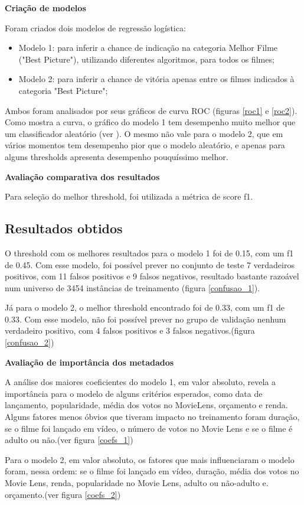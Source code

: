             \textbf{Criação de modelos}\par
            Foram criados dois modelos de regressão logística:
            
            \begin{itemize}
                \item Modelo 1: para inferir a chance de indicação na categoria Melhor Filme ("Best Picture"), utilizando diferentes algoritmos, para todos os filmes;
                \item Modelo 2: para inferir a chance de vitória apenas entre os filmes indicados à categoria "Best Picture";
            \end{itemize}
            
            Ambos foram analisados por seus gráficos de curva ROC (figuras \ref{roc1} e \ref{roc2}). Como mostra a curva, o gráfico  do modelo 1 tem desempenho muito melhor que um classificador aleatório (ver ). O mesmo não vale para o modelo 2, que em vários momentos tem desempenho pior que o modelo aleatório, e apenas para alguns thresholds apresenta desempenho pouquíssimo melhor.

            \textbf{Avaliação comparativa dos resultados}\par
            Para seleção do melhor threshold, foi utilizada a métrica de score f1.
            
        \subsection{Resultados obtidos}
            
            O threshold com os melhores resultados para o modelo 1 foi de 0.15, com um f1 de 0.45. Com esse modelo, foi possível prever no conjunto de teste 7 verdadeiros positivos, com 11 falsos positivos e 9 falsos negativos, resultado bastante razoável num universo de 3454 instâncias de treinamento (figura \ref{confusao_1}).
            
            Já para o modelo 2, o melhor threshold encontrado foi de 0.33, com um f1 de 0.33. Com esse modelo, não foi possível prever no grupo de validação nenhum verdadeiro positivo, com 4 falsos positivos e 3 falsos negativos.(figura \ref{confusao_2})

            \textbf{Avaliação de importância dos metadados}\par
            A análise dos maiores coeficientes do modelo 1, em valor absoluto, revela a importância para o modelo de alguns critérios esperados, como data de lançamento, popularidade, média dos votos no MovieLens, orçamento e renda. Alguns fatores menos óbvios que tiveram impacto no treinamento foram duração, se o filme foi lançado em vídeo, o número de votos no Movie Lens e se o filme é adulto ou não.(ver figura \ref{coefs_1})\par
            
            Para o modelo 2, em valor absoluto, os fatores que mais influenciaram o modelo foram, nessa ordem: se o filme foi lançado em vídeo, duração, média dos votos no Movie Lens, renda, popularidade no Movie Lens, adulto ou não-adulto e. orçamento.(ver figura \ref{coefs_2})\par
